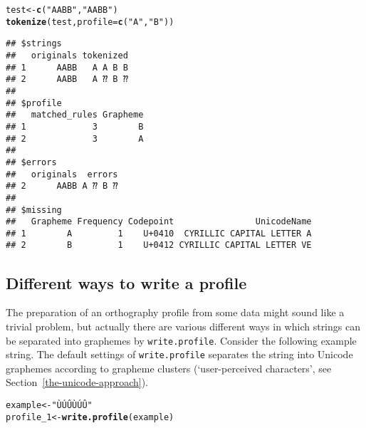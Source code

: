 \documentclass[output=inprep,
		biblatex
		]{LSP/langsci}\usepackage[]{graphicx}\usepackage[]{color}
\makeatletter
\newcommand{\hlstr}[1]{\textcolor[rgb]{0.192,0.494,0.8}{#1}}%
\newcommand{\hlstd}[1]{\textcolor[rgb]{0.345,0.345,0.345}{#1}}%
\newcommand{\hlkwb}[1]{\textcolor[rgb]{0.69,0.353,0.396}{#1}}%
\newcommand{\hlkwc}[1]{\textcolor[rgb]{0.333,0.667,0.333}{#1}}%
\newcommand{\hlkwd}[1]{\textcolor[rgb]{0.737,0.353,0.396}{\textbf{#1}}}%
\newenvironment{kframe}{%
 \def\at@end@of@kframe{}%
 \ifinner\ifhmode%
  \def\at@end@of@kframe{\end{minipage}}%
  \begin{minipage}{\columnwidth}%
 \fi\fi%
 \def\FrameCommand##1{\hskip\@totalleftmargin \hskip-\fboxsep
 \colorbox{shadecolor}{##1}\hskip-\fboxsep
     \hskip-\linewidth \hskip-\@totalleftmargin \hskip\columnwidth}%
 \MakeFramed {\advance\hsize-\width
   \@totalleftmargin\z@ \linewidth\hsize
   \@setminipage}}%
 {\par\unskip\endMakeFramed%
 \at@end@of@kframe}
\newenvironment{knitrout}{}{} %
\makeatother
\begin{document}
\begin{knitrout}\footnotesize
{}\color{fgcolor}\begin{kframe}
\begin{alltt}
\hlstd{test} \hlkwb{<-} \hlkwd{c}\hlstd{(}\hlstr{"AABB"}\hlstd{,} \hlstr{"AАBВ"}\hlstd{)}
\hlkwd{tokenize}\hlstd{(test,} \hlkwc{profile} \hlstd{=} \hlkwd{c}\hlstd{(}\hlstr{"A"}\hlstd{,} \hlstr{"B"}\hlstd{))}
\end{alltt}


{\ttfamily\noindent{}}\begin{verbatim}
## $strings
##   originals tokenized
## 1      AABB   A A B B
## 2      AАBВ   A ⁇ B ⁇
## 
## $profile
##   matched_rules Grapheme
## 1             3        B
## 2             3        A
## 
## $errors
##   originals  errors
## 2      AАBВ A ⁇ B ⁇
## 
## $missing
##   Grapheme Frequency Codepoint                UnicodeName
## 1        А         1    U+0410  CYRILLIC CAPITAL LETTER A
## 2        В         1    U+0412 CYRILLIC CAPITAL LETTER VE
\end{verbatim}
\end{kframe}
\end{knitrout}

\subsection*{Different ways to write a profile}

The preparation of an orthography profile from some data might sound like a 
trivial problem, but actually there are various different ways in which strings 
can be separated into graphemes by \texttt{write.profile}. Consider the 
following example string. The default settings of \texttt{write.profile} 
separates the string into Unicode graphemes according to grapheme clusters 
(`user-perceived characters', see Section~\ref{the-unicode-approach}).

\begin{knitrout}\footnotesize
{}\color{fgcolor}\begin{kframe}
\begin{alltt}
\hlstd{example} \hlkwb{<-} \hlstr{"ÙÚÛÙÚÛ"}
\hlstd{profile_1} \hlkwb{<-} \hlkwd{write.profile}\hlstd{(example)}
\end{alltt}
\end{kframe}
\end{knitrout}
\end{document}
